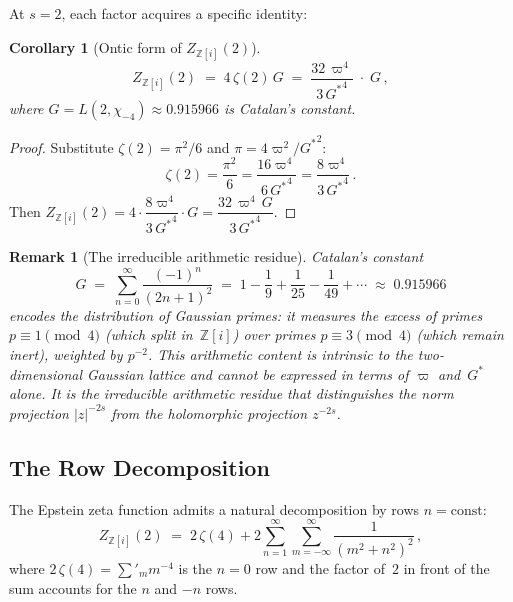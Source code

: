 \documentclass[12pt]{article}
\newtheorem{corollary}[theorem]{Corollary}
\newtheorem{remark}[theorem]{Remark}
\newcommand{\Z}{\mathbb{Z}}
\begin{document}
At $s=2$, each factor acquires a specific identity:

\begin{corollary}[Ontic form of $Z_{\Z[i]}(2)$]\label{cor:Z2-ontic}
\begin{equation}\label{eq:Z2-ontic}
Z_{\Z[i]}(2) \;=\; 4\,\zeta(2)\,G
\;=\;\frac{32\,\varpi^4}{3\,{G^{*}}^4}\;\cdot\; G\,,
\end{equation}
where $G=L(2,\chi_{-4})\approx 0.915966$ is Catalan's constant.
\end{corollary}
\begin{proof}
Substitute $\zeta(2)=\pi^2/6$ and $\pi=4\varpi^2/{G^{*}}^2$:
\[
\zeta(2)=\frac{\pi^2}{6}=\frac{16\varpi^4}{6\,{G^{*}}^4}
=\frac{8\varpi^4}{3\,{G^{*}}^4}\,.
\]
Then $Z_{\Z[i]}(2)=4\cdot\dfrac{8\varpi^4}{3\,{G^{*}}^4}\cdot G
=\dfrac{32\,\varpi^4\,G}{3\,{G^{*}}^4}$.
\end{proof}

\begin{remark}[The irreducible arithmetic residue]\label{rem:catalan}
Catalan's constant
\[
G \;=\; \sum_{n=0}^{\infty}\frac{(-1)^n}{(2n+1)^2}
\;=\; 1-\frac{1}{9}+\frac{1}{25}-\frac{1}{49}+\cdots
\;\approx\;0.915966
\]
encodes the distribution of Gaussian primes: it measures the excess of
primes $p\equiv 1\pmod{4}$ (which split in~$\Z[i]$) over primes
$p\equiv 3\pmod{4}$ (which remain inert), weighted by $p^{-2}$.  This
arithmetic content is intrinsic to the \emph{two-dimensional} Gaussian
lattice and cannot be expressed in terms of $\varpi$ and~${G^{*}}$ alone.
It is the irreducible arithmetic residue that distinguishes the norm
projection $|z|^{-2s}$ from the holomorphic projection $z^{-2s}$.
\end{remark}

\subsection{The Row Decomposition}\label{sec:row-decomp}

The Epstein zeta function admits a natural decomposition by rows
$n=\text{const}$:
\begin{equation}\label{eq:row-decomp}
Z_{\Z[i]}(2) \;=\; 2\,\zeta(4)
+ 2\sum_{n=1}^{\infty}\sum_{m=-\infty}^{\infty}\frac{1}{(m^2+n^2)^2}\,,
\end{equation}
where $2\,\zeta(4)=\sum'_m m^{-4}$ is the $n=0$ row and the factor of~$2$
in front of the sum accounts for the $n$ and $-n$ rows.
\end{document}
